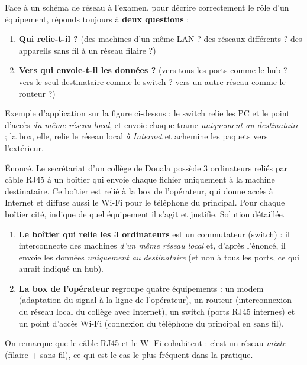 \documentclass[11pt]{article}
\newcommand{\cle}[1]{{\popxbold\color{popdark}#1}}
\begin{document}
\begin{methode}
Face à un schéma de réseau à l'examen, pour décrire correctement le rôle d'un équipement, réponds toujours à \textbf{deux questions} :
\begin{enumerate}
\item \textbf{Qui relie-t-il ?} (des machines d'un même LAN ? des réseaux différents ? des appareils sans fil à un réseau filaire ?)
\item \textbf{Vers qui envoie-t-il les données ?} (vers tous les ports comme le hub ? vers le seul destinataire comme le switch ? vers un autre réseau comme le routeur ?)
\end{enumerate}
Exemple d'application sur la figure ci-dessus : le switch relie les PC et le point d'accès \emph{du même réseau local}, et envoie chaque trame \emph{uniquement au destinataire} ; la box, elle, relie le réseau local \emph{à Internet} et achemine les paquets vers l'extérieur.
\end{methode}

\begin{exoresolu}
Énoncé. Le secrétariat d'un collège de Douala possède 3 ordinateurs reliés par câble RJ45 à un boîtier qui envoie chaque fichier uniquement à la machine destinataire. Ce boîtier est relié à la box de l'opérateur, qui donne accès à Internet et diffuse aussi le Wi-Fi pour le téléphone du principal. Pour chaque boîtier cité, indique de quel équipement il s'agit et justifie.
\tcblower
Solution détaillée.
\begin{enumerate}
\item \textbf{Le boîtier qui relie les 3 ordinateurs} est un \cle{commutateur (switch)} : il interconnecte des machines \emph{d'un même réseau local} et, d'après l'énoncé, il envoie les données \emph{uniquement au destinataire} (et non à tous les ports, ce qui aurait indiqué un hub).
\item \textbf{La box de l'opérateur} regroupe quatre équipements : un \cle{modem} (adaptation du signal à la ligne de l'opérateur), un \cle{routeur} (interconnexion du réseau local du collège avec Internet), un \cle{switch} (ports RJ45 internes) et un \cle{point d'accès Wi-Fi} (connexion du téléphone du principal en sans fil).
\end{enumerate}
On remarque que le câble RJ45 et le Wi-Fi cohabitent : c'est un réseau \emph{mixte} (filaire + sans fil), ce qui est le cas le plus fréquent dans la pratique.
\end{exoresolu}
\end{document}

